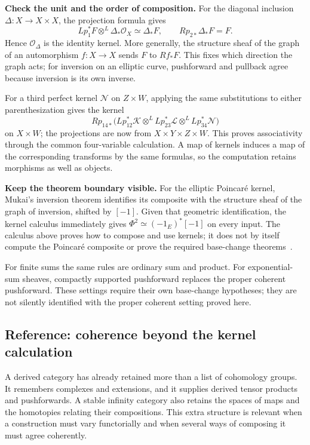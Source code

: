 \documentclass[11pt]{article}
\theoremstyle{remark}
\begin{document}
\textbf{Check the unit and the order of composition.}
For the diagonal inclusion \(\Delta:X\to X\times X\), the projection formula gives
\[
Lp_1^*F\otimes^L\Delta_*\mathcal O_X\simeq\Delta_*F,
\qquad Rp_{2*}\Delta_*F=F.
\]
Hence \(\mathcal O_\Delta\) is the identity kernel. More generally, the structure sheaf of the graph of an automorphism \(f:X\to X\) sends \(F\) to \(Rf_*F\). This fixes which direction the graph acts; for inversion on an elliptic curve, pushforward and pullback agree because inversion is its own inverse.

For a third perfect kernel \(\mathcal N\) on \(Z\times W\), applying the same substitutions to either parenthesization gives the kernel
\[
Rp_{14*}\bigl(Lp_{12}^*\mathcal K\otimes^L
Lp_{23}^*\mathcal L\otimes^L Lp_{34}^*\mathcal N\bigr)
\]
on \(X\times W\); the projections are now from \(X\times Y\times Z\times W\). This proves associativity through the common four-variable calculation. A map of kernels induces a map of the corresponding transforms by the same formulas, so the computation retains morphisms as well as objects.

\textbf{Keep the theorem boundary visible.}
For the elliptic Poincar\'e kernel, Mukai's inversion theorem identifies its composite with the structure sheaf of the graph of inversion, shifted by \([-1]\). Given that geometric identification, the kernel calculus immediately gives \(\Phi^2\simeq(-1_E)^*[-1]\) on every input. The calculus above proves how to compose and use kernels; it does not by itself compute the Poincar\'e composite or prove the required base-change theorems~\cite{chen}.

For finite sums the same rules are ordinary sum and product. For exponential-sum sheaves, compactly supported pushforward replaces the proper coherent pushforward. These settings require their own base-change hypotheses; they are not silently identified with the proper coherent setting proved here.

\subsection{Reference: coherence beyond the kernel calculation}

A derived category has already retained more than a list of cohomology groups. It remembers complexes and extensions, and it supplies derived tensor products and pushforwards. A stable infinity category also retains the spaces of maps and the homotopies relating their compositions. This extra structure is relevant when a construction must vary functorially and when several ways of composing it must agree coherently.
\end{document}
